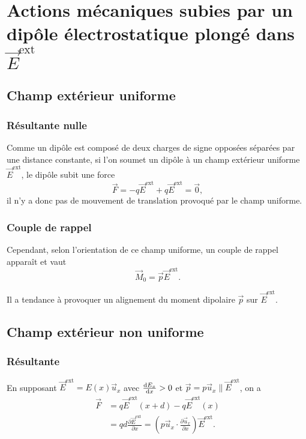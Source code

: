 \section[Actions mécaniques subies]{Actions mécaniques subies par un dipôle électrostatique plongé dans \texorpdfstring{$\vec{E}^{\text{ext}}$}{E}}

\subsection{Champ extérieur uniforme}
\subsubsection{Résultante nulle}

Comme un dipôle est composé de deux charges de signe opposées séparées par une distance constante, si l'on soumet un dipôle à un champ extérieur uniforme $\vec{E}^{\mathrm{ext}}$, le dipôle subit une force 
\begin{equation}
    \vec{F}=-q\vec{E}^{\mathrm{ext}}+q\vec{E}^{\mathrm{ext}}=\vec{0},
\end{equation}
il n'y a donc pas de mouvement de translation provoqué par le champ uniforme.

\subsubsection{Couple de rappel}

Cependant, selon l'orientation de ce champ uniforme, un couple de rappel apparaît et vaut
\begin{equation}
    \boxed{
        \vec{M}_{0}=\vec{p}\vec{E}^{\mathrm{ext}}.
    }
\end{equation}

Il a tendance à provoquer un alignement du moment dipolaire $\vec{p}$ sur $\vec{E}^{\mathrm{ext}}$.

\subsection{Champ extérieur non uniforme}
\subsubsection{Résultante}

En supposant $\vec{E}^{\mathrm{ext}}=E(x)\vec{u}_x$ avec $\frac{\mathrm{d} E_x}{\mathrm{d} x}>0$ et $\vec{p}=p\vec{u}_x\parallel\vec{E}^{\mathrm{ext}}$, on a 
\begin{align}
    \vec{F}
    &=
    q\vec{E}^{\mathrm{ext}}(x+d)-q\vec{E}^{\mathrm{ext}}(x)\\
    &=
    qd\frac{\partial \vec{E}^{\mathrm{ext}}}{\partial x}
    = \left(
        p\vec{u}_x\cdot\frac{\partial \vec{u}_x}{\partial x}
    \right)\vec{E}^{\mathrm{ext}}.
\end{align}

